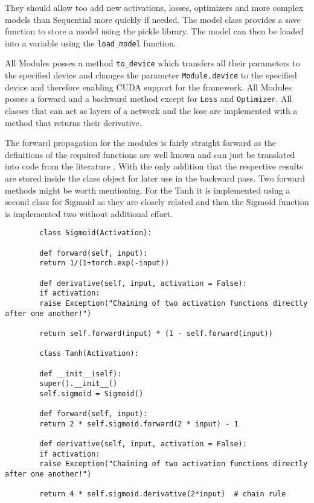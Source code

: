 \documentclass[11pt,english]{article}
\begin{document}
	They should allow too add new activations, losses, optimizers and more complex models than Sequential more quickly if needed. The model class provides a save function to store a model using the pickle library. The model can then be loaded into a variable using the \lstinline|load_model| function.
	
	All Modules posses a method \lstinline|to_device| which transfers all their parameters to the specified device and changes the parameter \lstinline|Module.device| to the specified device and therefore enabling CUDA support for the framework. All Modules posses a forward and a backward method except for \lstinline|Loss| and \lstinline|Optimizer|. All classes that can act as layers of a network and the loss are implemented with a method that returns their derivative.
	
	The forward propagation for the modules is fairly straight forward as the definitions of the required functions are well known and can just be translated into code from the literature \cite{Fleuret2022,Goodfellow-et-al-2016}. With the only addition that the respective results are stored inside the class object for later use in the backward pass. Two forward methods might be worth mentioning. For the Tanh it is implemented using a second class for Sigmoid as they are closely related and then the Sigmoid function is implemented two without additional effort.
	
	\begin{lstlisting}
		class Sigmoid(Activation):
		
		def forward(self, input):
		return 1/(1+torch.exp(-input))
		
		def derivative(self, input, activation = False):
		if activation:
		raise Exception("Chaining of two activation functions directly after one another!")
		
		return self.forward(input) * (1 - self.forward(input))
		
		class Tanh(Activation):
		
		def __init__(self):
		super().__init__()
		self.sigmoid = Sigmoid()
		
		def forward(self, input):
		return 2 * self.sigmoid.forward(2 * input) - 1
		
		def derivative(self, input, activation = False):
		if activation:
		raise Exception("Chaining of two activation functions directly after one another!")
		
		return 4 * self.sigmoid.derivative(2*input)  # chain rule  
	\end{lstlisting}
	
\end{document}

